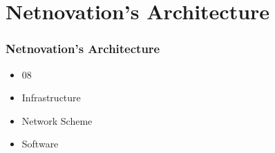 \section{Netnovation's Architecture}

\begin{frame}%
\frametitle{Netnovation's Architecture}

\begin{itemize}
  \item 08
  \item Infrastructure
  \item Network Scheme
  \item Software
\end{itemize}

\end{frame}